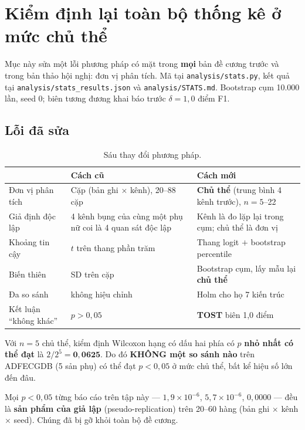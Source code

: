 \section{Kiểm định lại toàn bộ thống kê ở mức chủ thể}
\label{sec:thongke}

Mục này sửa một lỗi phương pháp có mặt trong \textbf{mọi} bản đề cương trước và trong bản thảo hội nghị:
đơn vị phân tích. Mã tại \texttt{analysis/stats.py}, kết quả tại \texttt{analysis/stats\_results.json} và
\texttt{analysis/STATS.md}. Bootstrap cụm 10.000 lần, seed 0; biên tương đương khai báo trước
$\delta = 1{,}0$ điểm F1.

\subsection{Lỗi đã sửa}

\begin{table}[H]\centering\small
\caption{Sáu thay đổi phương pháp.}
\label{tab:stat_sua}
\begin{tabular}{@{}L{3.4cm} L{5.2cm} L{5.6cm}@{}}
\toprule
 & \textbf{Cách cũ} & \textbf{Cách mới} \\
\midrule
Đơn vị phân tích & Cặp (bản ghi $\times$ kênh), 20--88 cặp & \textbf{Chủ thể} (trung bình 4 kênh trước),
$n = 5$--22 \\
Giả định độc lập & 4 kênh bụng của cùng một phụ nữ coi là 4 quan sát độc lập & Kênh là đo lặp lại trong
cụm; chủ thể là đơn vị \\
Khoảng tin cậy & $t$ trên thang phần trăm & Thang logit $+$ bootstrap percentile \\
Biến thiên & SD trên cặp & Bootstrap cụm, lấy mẫu lại \textbf{chủ thể} \\
Đa so sánh & không hiệu chỉnh & Holm cho họ 7 kiến trúc \\
Kết luận ``không khác'' & $p > 0{,}05$ & \textbf{TOST} biên 1,0 điểm \\
\bottomrule
\end{tabular}
\end{table}

\begin{canhbao}[title={Giới hạn cứng của $n = 5$ --- con số phải ghi nhớ}]
Với $n = 5$ chủ thể, kiểm định Wilcoxon hạng có dấu hai phía có $p$ \textbf{nhỏ nhất có thể đạt} là
$2/2^5 = \mathbf{0{,}0625}$. Do đó \textbf{KHÔNG một so sánh nào} trên ADFECGDB (5 sản phụ) có thể đạt
$p < 0{,}05$ ở mức chủ thể, bất kể hiệu số lớn đến đâu.

Mọi $p < 0{,}05$ từng báo cáo trên tập này --- $1{,}9\times10^{-6}$, $5{,}7\times10^{-6}$, $0{,}0000$ ---
đều là \textbf{sản phẩm của giả lập} (pseudo-replication) trên 20--60 hàng (bản ghi $\times$ kênh
$\times$ seed). Chúng đã bị gỡ khỏi toàn bộ đề cương.
\end{canhbao}

